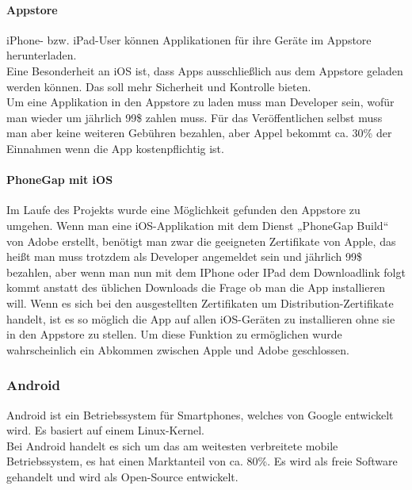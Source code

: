 \paragraph*{Appstore\\}
iPhone- bzw. iPad-User können Applikationen für ihre Geräte im Appstore herunterladen.\\ 
Eine Besonderheit an iOS ist, dass Apps ausschließlich aus dem Appstore geladen werden können. Das soll mehr Sicherheit und Kontrolle bieten.\\
Um eine Applikation in den Appstore zu laden muss man Developer sein, wofür man wieder um jährlich 99\$ zahlen muss. Für das Veröffentlichen selbst muss man aber keine weiteren Gebühren bezahlen, aber Appel bekommt ca. 30\% der Einnahmen wenn die App kostenpflichtig ist.\\
\paragraph*{PhoneGap mit iOS\\}
Im Laufe des Projekts wurde eine Möglichkeit gefunden den Appstore zu umgehen. Wenn man eine iOS-Applikation mit dem Dienst „PhoneGap Build“ von Adobe erstellt, benötigt man zwar die geeigneten Zertifikate von Apple, das heißt man muss trotzdem als Developer angemeldet sein und jährlich 99\$ bezahlen, aber wenn man nun mit dem IPhone oder IPad dem Downloadlink folgt kommt anstatt des üblichen Downloads die Frage ob man die App installieren will.
Wenn es sich bei den ausgestellten Zertifikaten um Distribution-Zertifikate handelt, ist es so möglich die App auf allen iOS-Geräten zu installieren ohne sie in den Appstore zu stellen. Um diese Funktion zu ermöglichen wurde wahrscheinlich ein Abkommen zwischen Apple und Adobe geschlossen.\\

\subsubsection{Android}
Android ist ein Betriebssystem für Smartphones, welches von Google entwickelt wird. Es basiert auf einem Linux-Kernel.\\
Bei Android handelt es sich um das am weitesten verbreitete mobile Betriebssystem, es hat einen Marktanteil von ca. 80\%. Es wird als freie Software gehandelt und wird als Open-Source entwickelt.\\
\\
